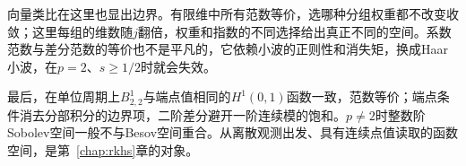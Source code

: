 向量类比在这里也显出边界。有限维中所有范数等价，选哪种分组权重都不改变收敛；这里每组的维数随$j$翻倍，权重和指数的不同选择给出真正不同的空间。系数范数与差分范数的等价也不是平凡的，它依赖小波的正则性和消失矩，换成Haar小波，在$p=2$、$s\geq1/2$时就会失效。

最后，在单位周期上$B^1_{2,2}$与端点值相同的$H^1(0,1)$函数一致，范数等价；端点条件消去分部积分的边界项，二阶差分避开一阶连续模的饱和。$p\neq2$时整数阶Sobolev空间一般不与Besov空间重合。从离散观测出发、具有连续点值读取的函数空间，是第~\ref{chap:rkhs}章的对象。
